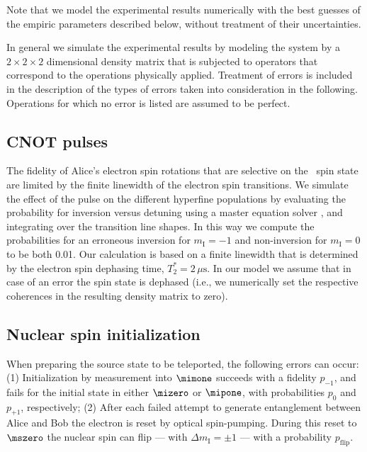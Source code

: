 Note that we model the experimental results numerically with the best guesses of the empiric parameters described below, without treatment of their uncertainties.

In general we simulate the experimental results by modeling the system by a $2\times 2 \times 2$ dimensional density matrix that is subjected to operators that correspond to the operations physically applied. Treatment of errors is included in the description of the types of errors taken into consideration in the following. Operations for which no error is listed are assumed to be perfect.

\subsection{CNOT pulses}

The fidelity of Alice's electron spin rotations that are selective on the \nfourteen\ spin state are limited by the finite linewidth of the electron spin transitions. We simulate the effect of the pulse on the different hyperfine populations by evaluating the probability for inversion versus detuning using a master equation solver \cite{2013CoPhC.184.1234J}, 
and integrating over the transition line shapes. In this way we compute the probabilities for an erroneous inversion for $m_\mathrm I = -1$ and non-inversion for $m_\mathrm I = 0$ to be both 0.01. Our calculation is based on a finite linewidth that is determined by the electron spin dephasing time, $T_2^* = 2\,\mu\mathrm s$. In our model we assume that in case of an error the spin state is dephased (i.e., we numerically set the respective coherences in the resulting density matrix to zero).

\subsection{Nuclear spin initialization}

When preparing the source state to be teleported, the following errors can occur: (1) Initialization by measurement into $\mimone$ succeeds with a fidelity $p_{-1}$, and fails for the initial state in either $\mizero$ or $\mipone$, with probabilities $p_0$ and $p_{+1}$, respectively; (2) After each failed attempt to generate entanglement between Alice and Bob the electron is reset by optical spin-pumping\cite{2013Natur.497...86B}. 
During this reset to $\mszero$ the nuclear spin can flip --- with $\Delta m_\mathrm I = \pm 1$ --- with a probability $p_\text{flip}$\cite{2010Sci...329..542N}.

